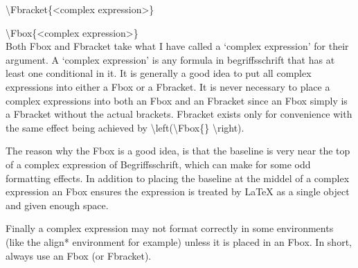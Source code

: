 \documentclass[12pt]{article}
\begin{document}
  \textbackslash Fbracket\{\textless complex expression\textgreater\}

  \textbackslash Fbox\{\textless complex expression\textgreater\}\\
  Both Fbox and Fbracket take what I have called a `complex expression' for their 
  argument. A `complex expression' is any formula in begriffsschrift that has at 
  least one conditional in it. It is generally a good idea to put all complex 
  expressions into either a Fbox or a Fbracket. It is never necessary to place a 
  complex expressions into both an Fbox and an Fbracket since an Fbox simply is a 
  Fbracket without the actual brackets. Fbracket exists only for convenience with 
  the same effect being achieved by \textbackslash left(\textbackslash Fbox\{\} 
  \textbackslash right).

  The reason why the Fbox is a good idea, is that the baseline is very near the top of
  a complex expression of Begriffsschrift, which can make for some odd formatting 
  effects. In addition to placing the baseline at the middel of a complex expression 
  an Fbox ensures the expression is treated by LaTeX as a single object and given 
  enough space.

  Finally a complex expression may not format correctly in some environments (like 
  the align* environment for example) unless it is placed in an Fbox. In short, 
  always use an Fbox (or Fbracket).
\end{document}

